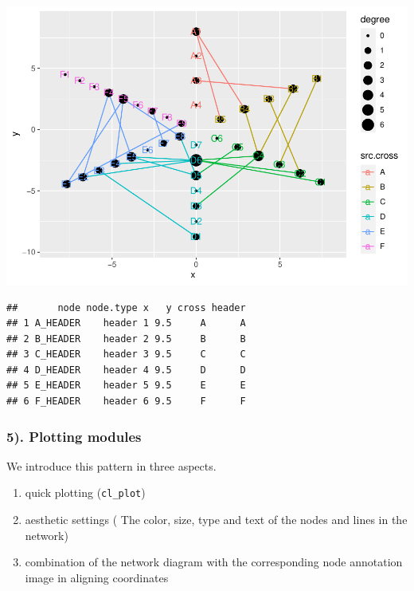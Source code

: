 \documentclass[
]{article}
\newenvironment{Shaded}{\begin{snugshade}}{\end{snugshade}}
\newcommand{\CommentTok}[1]{\textcolor[rgb]{0.56,0.35,0.01}{\textit{#1}}}
\newcommand{\DataTypeTok}[1]{\textcolor[rgb]{0.13,0.29,0.53}{#1}}
\newcommand{\KeywordTok}[1]{\textcolor[rgb]{0.13,0.29,0.53}{\textbf{#1}}}
\newcommand{\NormalTok}[1]{#1}
\newcommand{\OperatorTok}[1]{\textcolor[rgb]{0.81,0.36,0.00}{\textbf{#1}}}
\newcommand{\StringTok}[1]{\textcolor[rgb]{0.31,0.60,0.02}{#1}}
\providecommand{\tightlist}{%
  \setlength{\itemsep}{0pt}\setlength{\parskip}{0pt}}
\begin{document}
\includegraphics{ReadMe1_files/figure-latex/unnamed-chunk-7-6.pdf}

\begin{Shaded}
\end{Shaded}

\begin{verbatim}
##       node node.type x   y cross header
## 1 A_HEADER    header 1 9.5     A      A
## 2 B_HEADER    header 2 9.5     B      B
## 3 C_HEADER    header 3 9.5     C      C
## 4 D_HEADER    header 4 9.5     D      D
## 5 E_HEADER    header 5 9.5     E      E
## 6 F_HEADER    header 6 9.5     F      F
\end{verbatim}

\hypertarget{plotting-modules}{%
\subsubsection{5). Plotting modules}\label{plotting-modules}}

We introduce this pattern in three aspects.

\begin{enumerate}
\def\labelenumi{\alph{enumi}.}
\tightlist
\item
  quick plotting (\texttt{cl\_plot})
\item
  aesthetic settings ( The color, size, type and text of the nodes and
  lines in the network)
\item
  combination of the network diagram with the corresponding node
  annotation image in aligning coordinates
\end{enumerate}
\end{document}
